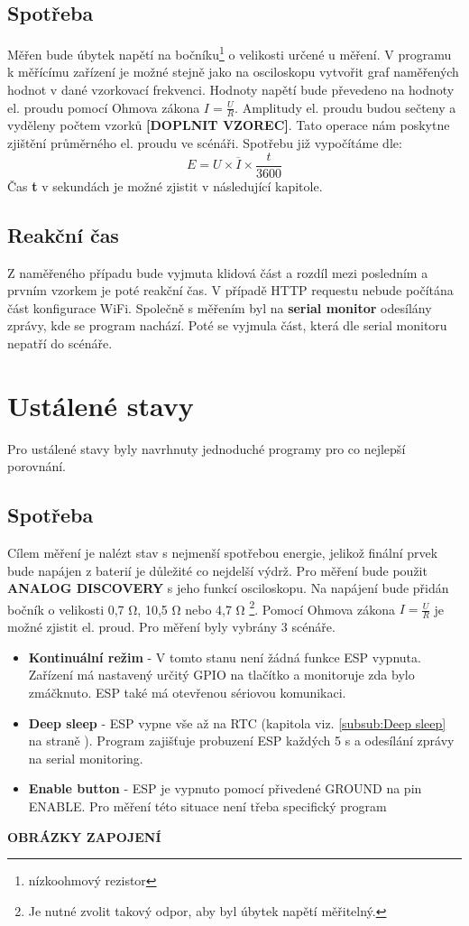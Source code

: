 \documentclass[a4paper, 12pt]{report}
\begin{document}
				\subsection{Spotřeba}
					Měřen bude úbytek napětí na bočníku\footnote{nízkoohmový rezistor} o velikosti určené u měření. V programu k měřícímu zařízení je možné stejně jako na osciloskopu vytvořit graf naměřených hodnot v dané vzorkovací frekvenci. Hodnoty napětí bude převedeno na hodnoty el. proudu pomocí Ohmova zákona $I = \frac{U}{R}$. Amplitudy el. proudu budou sečteny a vyděleny počtem vzorků {\bf[DOPLNIT VZOREC]}. Tato operace nám poskytne zjištění průměrného el. proudu ve scénáři. Spotřebu již vypočítáme dle:
					$$E = U \times \overline{I} \times \frac{t}{3600}$$
					Čas {\bf t} v sekundách je možné zjistit v následující kapitole.
				\subsection{Reakční čas}
					Z naměřeného případu bude vyjmuta klidová část a rozdíl mezi posledním a prvním vzorkem je poté reakční čas. V případě HTTP requestu nebude počítána část konfigurace WiFi. Společně s měřením byl na {\bf serial monitor} odesílány zprávy, kde se program nachází. Poté se vyjmula část, která dle serial monitoru nepatří do scénáře.

			\section{Ustálené stavy}
				Pro ustálené stavy byly navrhnuty jednoduché programy pro co nejlepší porovnání.
				\subsection{Spotřeba} \label{metodika:Ustálené stavy spotřeba}
					Cílem měření je nalézt stav s nejmenší spotřebou energie, jelikož finální prvek bude napájen z baterií je důležité co nejdelší výdrž. Pro měření bude použit {\bf ANALOG DISCOVERY} s jeho funkcí osciloskopu. Na napájení bude přidán bočník o velikosti 0,7 \si{\ohm}, 10,5 \si{\ohm} nebo 4,7 \si{\ohm} \footnote{Je nutné zvolit takový odpor, aby byl úbytek napětí měřitelný.}. Pomocí Ohmova zákona $ I = \frac{U}{R} $ je možné zjistit el. proud. Pro měření byly vybrány 3 scénáře.\\
					\begin{itemize}
						\item {\bf Kontinuální režim} - V tomto stanu není žádná funkce ESP vypnuta. Zařízení má nastavený určitý GPIO na tlačítko a monitoruje zda bylo zmáčknuto. ESP také má otevřenou sériovou komunikaci.
						\item {\bf Deep sleep} - ESP vypne vše až na RTC (kapitola viz. \ref{subsub:Deep sleep} na straně \pageref{subsub:Deep sleep}). Program zajišťuje probuzení ESP každých 5 \si{s} a odesílání zprávy na serial monitoring.
						\item {\bf Enable button} - ESP je vypnuto pomocí přivedené GROUND na pin ENABLE. Pro měření této situace není třeba specifický program
					\end{itemize}
					{\bf OBRÁZKY ZAPOJENÍ}
\end{document}
